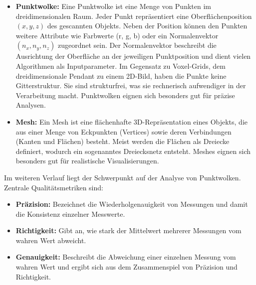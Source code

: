 \begin{German}
    \begin{itemize}
        \item \textbf{Punktwolke:} Eine Punktwolke ist eine Menge von Punkten im dreidimensionalen Raum. Jeder Punkt repräsentiert eine Oberflächenposition \((x, y, z)\) des gescannten Objekts. Neben der Position können den Punkten weitere Attribute wie Farbwerte (r, g, b) oder ein Normalenvektor \((n_x, n_y, n_z)\) zugeordnet sein. Der Normalenvektor beschreibt die Ausrichtung der Oberfläche an der jeweiligen Punktposition und dient vielen Algorithmen als Inputparameter. Im Gegensatz zu Voxel-Grids, dem dreidimensionale Pendant zu einem 2D-Bild, haben die Punkte keine Gitterstruktur. Sie sind strukturfrei, was sie rechnerisch aufwendiger in der Verarbeitung macht. Punktwolken eignen sich besonders gut für präzise Analysen. \cite{liu3DPointCloud2021}
        \item \textbf{Mesh:} Ein Mesh ist eine flächenhafte 3D-Repräsentation eines Objekts, die aus einer Menge von Eckpunkten (Vertices) sowie deren Verbindungen (Kanten und Flächen) besteht. Meist werden die Flächen als Dreiecke definiert, wodurch ein sogenanntes Dreiecksnetz entsteht. Meshes eignen sich besonders gut für realistische Visualisierungen. \cite{borrusoProceduralPointCloud2023}
    \end{itemize}

    Im weiteren Verlauf liegt der Schwerpunkt auf der Analyse von Punktwolken. Zentrale Qualitätsmetriken sind:


    \begin{itemize}
        \item \textbf{Präzision:} Bezeichnet die Wiederholgenauigkeit von Messungen und damit die Konsistenz einzelner Messwerte. \cite{wieserKursGeodaetischeMesstechnik}
        
        \item \textbf{Richtigkeit:} Gibt an, wie stark der Mittelwert mehrerer Messungen vom wahren Wert abweicht. \cite{wieserKursGeodaetischeMesstechnik}
        
        \item \textbf{Genauigkeit:} Beschreibt die Abweichung einer einzelnen Messung vom wahren Wert und ergibt sich aus dem Zusammenspiel von Präzision und Richtigkeit. \cite{wieserKursGeodaetischeMesstechnik}
        

\end{itemize}
\end{German}
